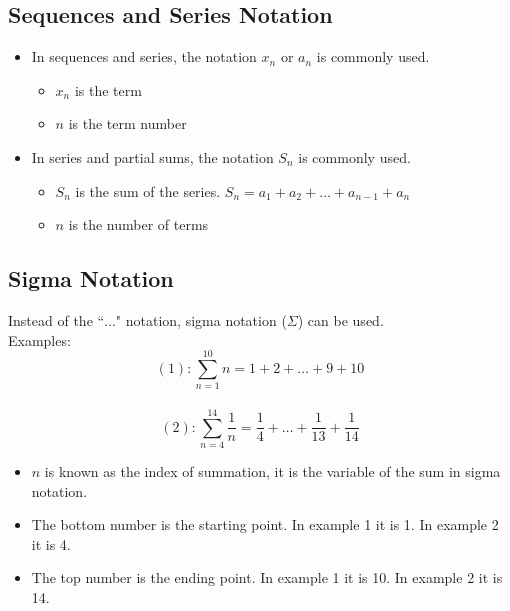 \documentclass[12pt]{article}
\begin{document}
\subsection{Sequences and Series Notation}
\begin{itemize}
    \item In sequences and series, the notation $x_n$ or $a_n$ is commonly used.
    \begin{itemize}
        \item $x_n$ is the term
        \item $n$ is the term number
    \end{itemize}
    \item In series and partial sums, the notation $S_n$ is commonly used.
    \begin{itemize}
        \item $S_n$ is the sum of the series. $S_n = a_1 + a_2 + \dots + a_{n-1} + a_n$
        \item $n$ is the number of terms
    \end{itemize}
\end{itemize}

\subsection{Sigma Notation}
Instead of the ``$\dots$" notation, sigma notation ($\Sigma$) can be used. \\

Examples:
$$(1): \sum_{n=1}^{10} n = 1 + 2 + \dots + 9 + 10$$\\
$$(2): \sum_{n=4}^{14} \frac{1}{n} = \frac{1}{4} + \dots + \frac{1}{13} + \frac{1}{14}$$
\begin{itemize}
    \item $n$ is known as the index of summation, it is the variable of the sum in sigma notation.
    \item The bottom number is the starting point. In example 1 it is 1. In example 2 it is 4.
    \item The top number is the ending point. In example 1 it is 10. In example 2 it is 14. 
\end{itemize}
\end{document}
